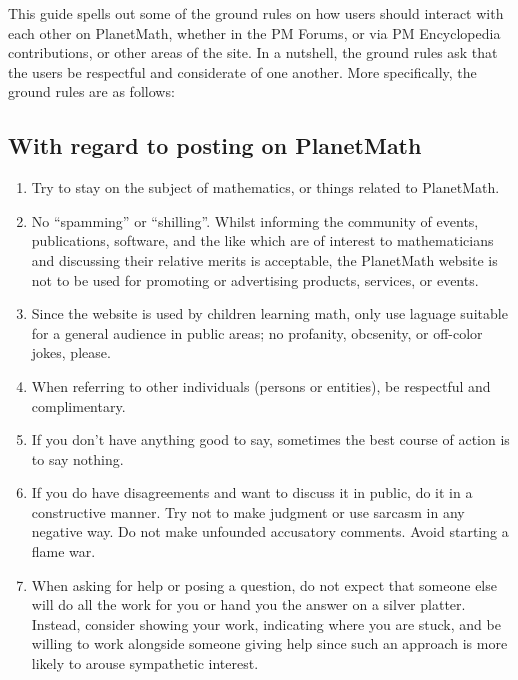 
This guide spells out some of the ground rules on how users should
interact with each other on PlanetMath, whether in the PM Forums, or via PM Encyclopedia contributions, or other areas of the site. In a nutshell, the ground rules ask that the users be respectful and considerate of one another. More specifically, the ground rules are as follows:

\subsection{With regard to posting on PlanetMath}
\begin{enumerate}
\item Try to stay on the subject of mathematics, or things related to PlanetMath.
\item No ``spamming'' or ``shilling''.  Whilst informing the community of events, publications, software, and the like which are of interest to mathematicians and discussing their relative merits  is acceptable, the PlanetMath website is not to be used for promoting or advertising products, services, or events.
\item Since the website is used by children learning math, only use laguage suitable for a general audience in public areas; no profanity, obcsenity, or off-color jokes, please.
\item When referring to other individuals (persons or entities), be respectful and complimentary.
\item If you don't have anything good to say, sometimes the best course of action is to say nothing.
\item If you do have disagreements and want to discuss it in public, do it in a constructive manner. Try not to make judgment or use sarcasm in any negative way. Do not make unfounded accusatory comments. Avoid starting a flame war.
\item When asking for help or posing a question, do not expect that someone else will do all the work for you or hand you the answer on a silver platter.  Instead, consider showing your work, indicating where you are stuck, and be willing to work alongside someone giving help since such an approach is more likely to arouse sympathetic interest.
\end{enumerate}


